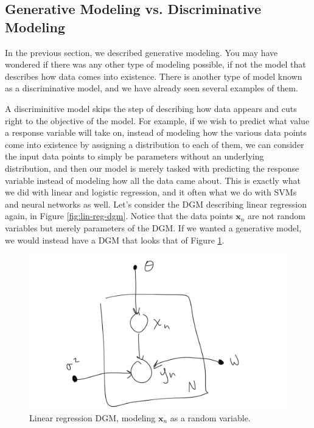 \subsection{Generative Modeling vs. Discriminative Modeling}
In the previous section, we described generative modeling. You may have wondered if there was any other type of modeling possible, if not the model that describes how data comes into existence. There is another type of model known as a discriminative model, and we have already seen several examples of them.

A discriminitive model skips the step of describing how data appears and cuts right to the objective of the model. For example, if we wish to predict what value a response variable will take on, instead of modeling how the various data points come into existence by assigning a distribution to each of them, we can consider the input data points to simply be parameters without an underlying distribution, and then our model is merely tasked with predicting the response variable instead of modeling how all the data came about. This is exactly what we did with linear and logistic regression, and it often what we do with SVMs and neural networks as well. Let's consider the DGM describing linear regression again, in Figure \ref{fig:lin-reg-dgm}. Notice that the data points $\textbf{x}_n$ are not random variables but merely parameters of the DGM. If we wanted a generative model, we would instead have a DGM that looks that of Figure \ref{fig:lin-reg-model-x}.
\begin{figure}
	\centering
	\includegraphics[width=0.5\paperwidth]{../GraphicalModels/fig/lin-reg-model-x.png}
    \caption{Linear regression DGM, modeling $\textbf{x}_n$ as a random variable.}
	\label{fig:lin-reg-model-x}
\end{figure}

